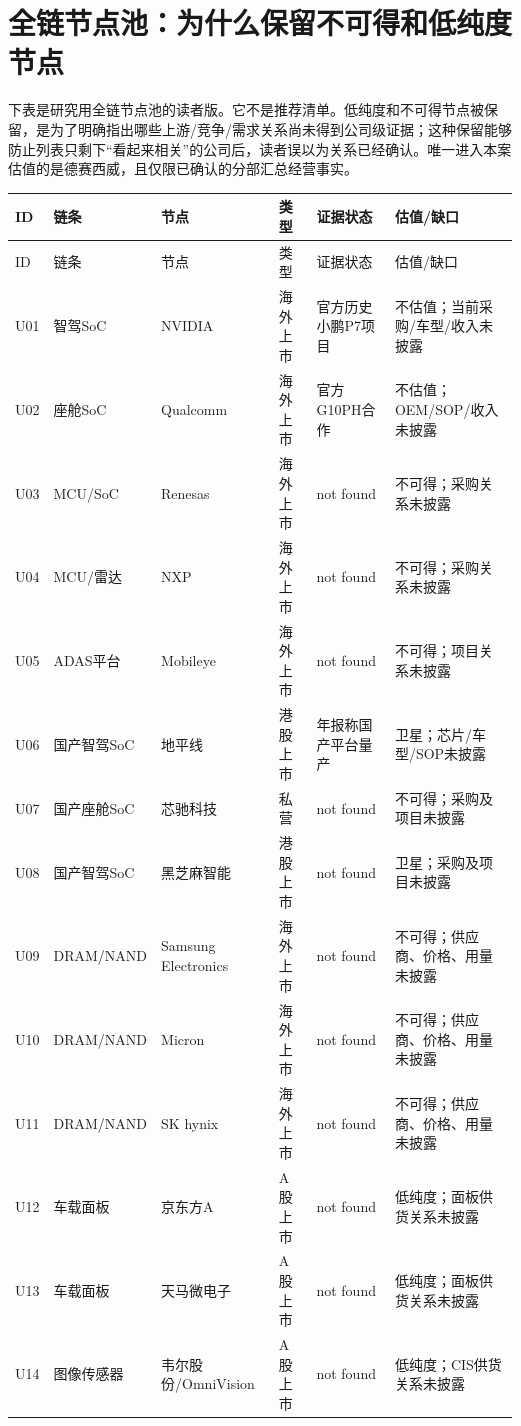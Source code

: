\renewcommand{\arraystretch}{1.90}
\section{全链节点池：为什么保留不可得和低纯度节点}

下表是研究用全链节点池的读者版。它不是推荐清单。低纯度和不可得节点被保留，是为了明确指出哪些上游/竞争/需求关系尚未得到公司级证据；这种保留能够防止列表只剩下“看起来相关”的公司后，读者误以为关系已经确认。唯一进入本案估值的是德赛西威，且仅限已确认的分部汇总经营事实。

\begin{longtable}{L{1.0cm}L{1.7cm}L{2.2cm}L{2.3cm}L{2.6cm}L{3.4cm}}
\toprule
ID & 链条 & 节点 & 类型 & 证据状态 & 估值/缺口 \\
\midrule
\endfirsthead
\toprule
ID & 链条 & 节点 & 类型 & 证据状态 & 估值/缺口 \\
\midrule
\endhead
U01 & 智驾SoC & NVIDIA & 海外上市 & 官方历史小鹏P7项目 & 不估值；当前采购/车型/收入未披露 \\
U02 & 座舱SoC & Qualcomm & 海外上市 & 官方G10PH合作 & 不估值；OEM/SOP/收入未披露 \\
U03 & MCU/SoC & Renesas & 海外上市 & not found & 不可得；采购关系未披露 \\
U04 & MCU/雷达 & NXP & 海外上市 & not found & 不可得；采购关系未披露 \\
U05 & ADAS平台 & Mobileye & 海外上市 & not found & 不可得；项目关系未披露 \\
U06 & 国产智驾SoC & 地平线 & 港股上市 & 年报称国产平台量产 & 卫星；芯片/车型/SOP未披露 \\
U07 & 国产座舱SoC & 芯驰科技 & 私营 & not found & 不可得；采购及项目未披露 \\
U08 & 国产智驾SoC & 黑芝麻智能 & 港股上市 & not found & 卫星；采购及项目未披露 \\
U09 & DRAM/NAND & Samsung Electronics & 海外上市 & not found & 不可得；供应商、价格、用量未披露 \\
U10 & DRAM/NAND & Micron & 海外上市 & not found & 不可得；供应商、价格、用量未披露 \\
U11 & DRAM/NAND & SK hynix & 海外上市 & not found & 不可得；供应商、价格、用量未披露 \\
U12 & 车载面板 & 京东方A & A股上市 & not found & 低纯度；面板供货关系未披露 \\
U13 & 车载面板 & 天马微电子 & A股上市 & not found & 低纯度；面板供货关系未披露 \\
U14 & 图像传感器 & 韦尔股份/OmniVision & A股上市 & not found & 低纯度；CIS供货关系未披露 \\

\end{longtable}
